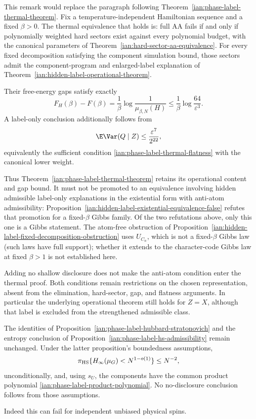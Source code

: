 \begin{remark}
\label{ian:hidden-label-thermal-replacement}
This remark would replace the paragraph following Theorem~\ref{ian:phase-label-thermal-theorem}. Fix a temperature-independent Hamiltonian sequence and a fixed
\(\beta>0\). The thermal equivalence that holds is:
full AA fails if and only if polynomially weighted hard sectors exist against every polynomial budget, with the canonical parameters of
Theorem~\ref{ian:hard-sector-aa-equivalence}. For every fixed decomposition satisfying the component simulation bound, those sectors admit the component-program and enlarged-label explanation of
Theorem~\ref{ian:hidden-label-operational-theorem}.

Their free-energy gaps satisfy exactly
\[
 F_H(\beta)-F(\beta)
 =\frac1\beta\log\frac1{\mu_{\beta,N}(H)}
 \le\frac1\beta\log\frac{64}{\varepsilon^3}.
\]
A label-only conclusion additionally follows from
\[
 \E\Var(Q\mid Z)\le\frac{\varepsilon^7}{2^{22}},
\]
equivalently the sufficient condition
\eqref{ian:phase-label-thermal-flatness} with the canonical lower weight.

Thus Theorem~\ref{ian:phase-label-thermal-theorem} retains its operational content and gap bound. It must not be promoted to an equivalence involving hidden admissible label-only explanations in the existential form with anti-atom admissibility: Proposition~\ref{ian:hidden-label-existential-equivalence-false} refutes that promotion for a fixed-\(\beta\) Gibbs family. Of the two refutations above, only this one is a Gibbs statement. The atom-free obstruction of Proposition~\ref{ian:hidden-label-fixed-decomposition-obstruction} uses \(U_{C_n}\), which is not a fixed-\(\beta\) Gibbs law (such laws have full support); whether it extends to the character-code Gibbs law at fixed \(\beta>1\) is not established here.

Adding no shallow disclosure does not make the anti-atom condition enter the thermal proof. Both conditions remain restrictions on the chosen representation, absent from the elimination, hard-sector, gap, and flatness arguments. In particular the underlying operational theorem still holds for \(Z=X\), although that label is excluded from the strengthened admissible class.
\end{remark}

\begin{proposition}
\label{ian:hidden-label-hs-limitation}
The identities of
Proposition~\ref{ian:phase-label-hubbard-stratonovich} and the entropy conclusion of
Proposition~\ref{ian:phase-label-hs-admissibility} remain unchanged. Under the latter proposition's boundedness assumptions,
\[
 \pi_{\rm HS}\{H_\infty(\mu_G)<N^{1-o(1)}\}\le N^{-2},
\]
unconditionally, and, using \(s_U\), the components have the common product polynomial \eqref{ian:phase-label-product-polynomial}.
No no-disclosure conclusion follows from those assumptions.

Indeed this can fail for independent unbiased physical spins.
\end{proposition}

